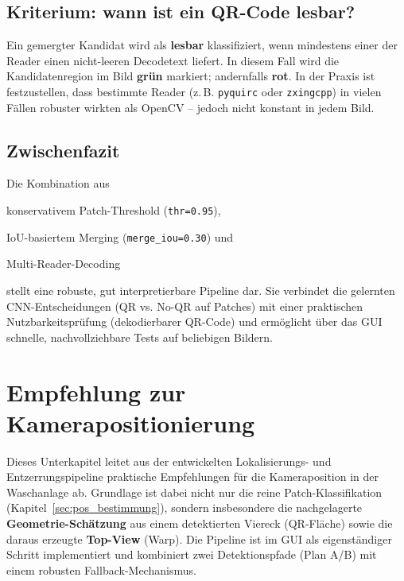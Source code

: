 \subsection{Kriterium: wann ist ein QR-Code lesbar?}
\label{subsec:lesbar_kriterium}

Ein gemergter Kandidat wird als \textbf{lesbar} klassifiziert, wenn mindestens einer der Reader einen nicht-leeren Decodetext liefert.
In diesem Fall wird die Kandidatenregion im Bild \textbf{grün} markiert; andernfalls \textbf{rot}. In der Praxis ist festzustellen, dass bestimmte Reader (z.\,B. \texttt{pyquirc} oder \texttt{zxingcpp}) in vielen Fällen robuster wirkten als OpenCV – jedoch nicht konstant in jedem Bild.

\subsection{Zwischenfazit}
\label{subsec:lesbarkeit_fazit}

Die Kombination aus 
\begin{listAlphB}
    \item konservativem Patch-Threshold (\texttt{thr=0.95}),
    \item \ac{IoU}-basiertem Merging (\texttt{merge\_iou=0.30}) und
    \item Multi-Reader-Decoding
\end{listAlphB}
stellt eine robuste, gut interpretierbare Pipeline dar. Sie verbindet die gelernten \ac{CNN}-Entscheidungen (\ac{QR} vs. No-\ac{QR} auf Patches) mit einer praktischen Nutzbarkeitsprüfung (dekodierbarer \ac{QR}-Code) und ermöglicht über das \ac{GUI} schnelle, nachvollziehbare Tests auf beliebigen Bildern.




\section{Empfehlung zur Kamerapositionierung}
\label{sec:camera_reco}

Dieses Unterkapitel leitet aus der entwickelten Lokalisierungs- und Entzerrungspipeline praktische Empfehlungen für die Kameraposition in der Waschanlage ab. Grundlage ist dabei nicht nur die reine Patch-Klassifikation (Kapitel~\ref{sec:pos_bestimmung}), sondern insbesondere die nachgelagerte \textbf{Geometrie-Schätzung} aus einem detektierten Viereck (\ac{QR}-Fläche) sowie die daraus erzeugte \textbf{Top-View} (\glqq Warp\grqq{}). Die Pipeline ist im \ac{GUI} als eigenständiger Schritt implementiert und kombiniert zwei Detektionspfade (Plan A/B) mit einem robusten Fallback-Mechanismus.


